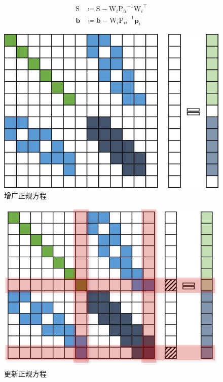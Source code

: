 \begin{algorithm}
\begin{algorithmic}
        \[\begin{aligned}
                \mathrm{S} &\coloneqq \mathrm{S} - \mathrm{W}_i{\mathrm{P}_{ii}}^{-1}{\mathrm{W}_i}^\top \\
                \bm{b}     &\coloneqq \bm{b}     - \mathrm{W}_i{\mathrm{P}_{ii}}^{-1}\bm{p}_i
        \end{aligned}\]
    \EndFor

\end{algorithmic}
\label{alg:factor_graph_aug}
\end{algorithm}

\begin{figure}[htb!]
    \centering
    \includegraphics{figs/normal_eq_aug.png}
    \caption{增广正规方程}
    \label{fig:normal_eq_aug}
\end{figure}

\begin{figure}[htb!]
    \centering
    \includegraphics{figs/normal_eq_update.png}
    \caption{更新正规方程}
    \label{fig:normal_eq_update}
\end{figure}

